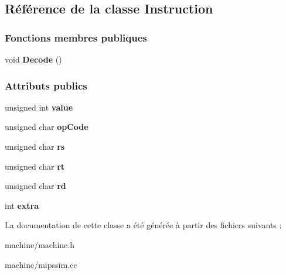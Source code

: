 \hypertarget{class_instruction}{}\subsection{Référence de la classe Instruction}
\label{class_instruction}
\subsubsection*{Fonctions membres publiques}
\begin{DoxyCompactItemize}
\item 
\hypertarget{class_instruction_acbdc34d695f5fa324a8418ef7a916814}{}\label{class_instruction_acbdc34d695f5fa324a8418ef7a916814} 
void {\bfseries Decode} ()
\end{DoxyCompactItemize}
\subsubsection*{Attributs publics}
\begin{DoxyCompactItemize}
\item 
\hypertarget{class_instruction_a2064608446020ab71465daac2f66488c}{}\label{class_instruction_a2064608446020ab71465daac2f66488c} 
unsigned int {\bfseries value}
\item 
\hypertarget{class_instruction_a6641032fb5153319be1789ba63fe210a}{}\label{class_instruction_a6641032fb5153319be1789ba63fe210a} 
unsigned char {\bfseries op\+Code}
\item 
\hypertarget{class_instruction_ac357d6666daf8fd25160974ab6a90fe6}{}\label{class_instruction_ac357d6666daf8fd25160974ab6a90fe6} 
unsigned char {\bfseries rs}
\item 
\hypertarget{class_instruction_a4c4966454413e2c3c0c6113b67e0590c}{}\label{class_instruction_a4c4966454413e2c3c0c6113b67e0590c} 
unsigned char {\bfseries rt}
\item 
\hypertarget{class_instruction_a53a3868c12e80929872bddf3a66ecd75}{}\label{class_instruction_a53a3868c12e80929872bddf3a66ecd75} 
unsigned char {\bfseries rd}
\item 
\hypertarget{class_instruction_a194c6318e79c1a8dde023b1f2be2a593}{}\label{class_instruction_a194c6318e79c1a8dde023b1f2be2a593} 
int {\bfseries extra}
\end{DoxyCompactItemize}


La documentation de cette classe a été générée à partir des fichiers suivants \+:\begin{DoxyCompactItemize}
\item 
machine/machine.\+h\item 
machine/mipssim.\+cc\end{DoxyCompactItemize}
